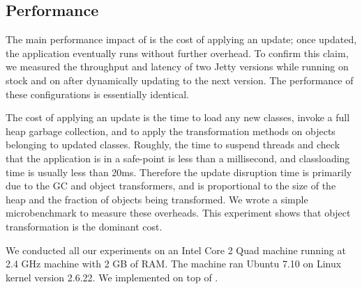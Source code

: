 


\subsection{Performance}
\label{subsec:performance}

The main performance impact of \DSU{} is the cost of applying an update;
once updated, the application eventually runs without further overhead.  To confirm
this claim, we measured the throughput and latency of two Jetty versions while running on
stock \JikesRVM{} and on \DSU{} after dynamically updating to the next version. The performance of these configurations is
essentially identical.


The cost of applying an update is the time to load any new classes, invoke a
full heap garbage collection, and to apply the transformation methods on
objects belonging to updated classes.
Roughly,
the time to suspend threads and check
that the application is in a safe-point is less than a millisecond, and classloading
time is usually less than 20ms.
Therefore the update disruption time is primarily
due to the GC and object transformers, and is proportional
to the size of the heap and the fraction of objects being transformed.  We
wrote a simple microbenchmark to measure these overheads.
This experiment shows that object
transformation is the dominant cost.

We conducted all our experiments on an Intel Core 2 Quad machine running at 2.4 GHz machine with 2 GB of RAM.
The machine ran Ubuntu 7.10 on Linux kernel version 2.6.22. We implemented
\DSU{} on top of \JRVMVersion{}.




